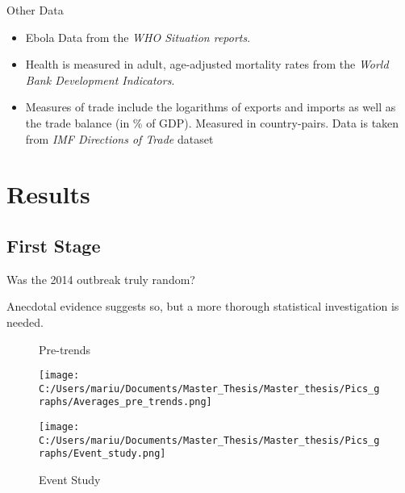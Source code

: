 \documentclass[11pt]{beamer}
\begin{document}
\begin{frame}{Other Data}
\begin{itemize}
\item Ebola Data from the \textit{WHO Situation reports}.

\item Health is measured in adult, age-adjusted mortality rates from the \textit{World Bank Development Indicators}.

\item Measures of trade include the logarithms of exports and imports as well as the trade balance (in \% of GDP). Measured in country-pairs.
Data is taken from \textit{IMF Directions of Trade} dataset

\end{itemize}

\end{frame}

\section{Results}

\subsection{First Stage}

\begin{frame}{Was the 2014 outbreak truly random?}

Anecdotal evidence suggests so, but a more thorough statistical investigation is needed.

\begin{figure}[!ht]
\begin{center}
\begin{minipage}[t]{\textwidth}
\begin{minipage}[t]{0.5\linewidth}\caption{Pre-trends \label{Pre-trends}}
\texttt{[image: C:/Users/mariu/Documents/Master\_Thesis/Master\_thesis/Pics\_graphs/Averages\_pre\_trends.png]}\\
\end{minipage}\hfill%
\begin{minipage}[t]{0.5\linewidth}\caption{Event Study \label{Event Study}}
\texttt{[image: C:/Users/mariu/Documents/Master\_Thesis/Master\_thesis/Pics\_graphs/Event\_study.png]}\\
\end{minipage}\hfill%
\end{minipage}
\end{center}
\end{figure}

\end{frame}
\end{document}
